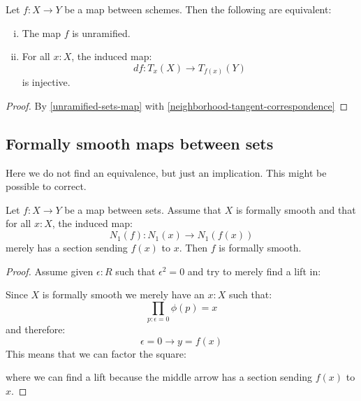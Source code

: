 \begin{corollary}\label{unramified-map-between-scheme-alt}
Let $f:X\to Y$ be a map between schemes. Then the following are equivalent:
\begin{enumerate}[(i)]
\item The map $f$ is unramified. 
\item For all $x:X$, the induced map:
\[df : T_x(X)\to T_{f(x)}(Y)\]
is injective.
\end{enumerate}
\end{corollary}

\begin{proof}
By \cref{unramified-sets-map} with \cref{neighborhood-tangent-correspondence}
\end{proof}

\subsection{Formally smooth maps between sets}

Here we do not find an equivalence, but just an implication. This might be possible to correct.

\begin{proposition}\label{smooth-sets-map}
Let $f:X\to Y$ be a map between sets. Assume that $X$ is formally smooth and that for all $x:X$, the induced map:
\[N_1(f) : N_1(x)\to N_1(f(x))\]
merely has a section sending $f(x)$ to $x$. Then $f$ is formally smooth.
\end{proposition}

\begin{proof}
Assume given $\epsilon:R$ such that $\epsilon^2=0$ and try to merely find a lift in:
 \begin{center}
    \end{center}
    Since $X$ is formally smooth we merely have an $x:X$ such that:
\[\prod_{p:\epsilon=0} \phi(p)=x\]
and therefore:
\[ \epsilon=0 \to y=f(x)\]
This means that we can factor the square:
 \begin{center}
    \end{center}
    where we can find a lift because the middle arrow has a section sending $f(x)$ to $x$.
\end{proof}

